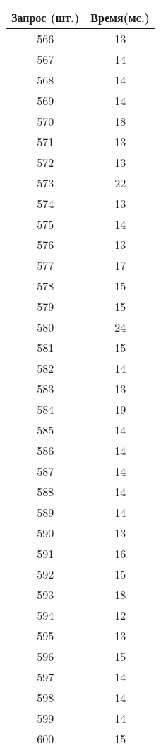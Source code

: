 \begin{table}[H]
\begin{minipage}{.4\textwidth}
\begin{tabular}{|c|c|}
			\hline
			Запрос (шт.)& Время(мс.) \\
			\hline
			566 & 13 \\
			567 & 14 \\
			568 & 14 \\
			569 & 14 \\
			570 & 18 \\
			571 & 13 \\
			572 & 13 \\
			573 & 22 \\
			574 & 13 \\
			575 & 14 \\
			576 & 13 \\
			577 & 17 \\
			578 & 15 \\
			579 & 15 \\
			580 & 24 \\
			581 & 15 \\
			582 & 14 \\
			583 & 13 \\
			584 & 19 \\
			585 & 14 \\
			586 & 14 \\
			587 & 14 \\
			588 & 14 \\
			589 & 14 \\
			590 & 13 \\
			591 & 16 \\
			592 & 15 \\
			593 & 18 \\
			594 & 12 \\
			595 & 13 \\
			596 & 15 \\
			597 & 14 \\
			598 & 14 \\
			599 & 14 \\
			600 & 15 \\
			\hline
		\end{tabular}
	\label{tab:256}
	\end{minipage}
\end{table}


